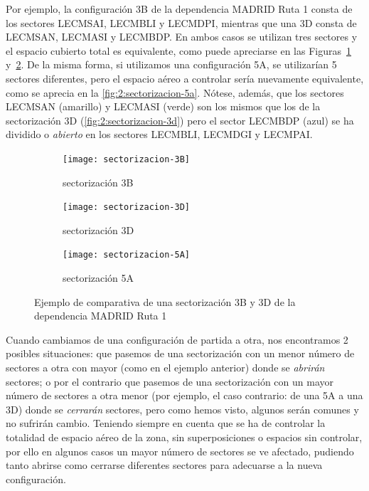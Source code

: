 Por ejemplo, la configuración 3B de la dependencia MADRID Ruta 1 consta de los sectores LECMSAI, LECMBLI y LECMDPI, mientras que una 3D consta de LECMSAN, LECMASI y LECMBDP. En ambos casos se utilizan tres sectores y el espacio cubierto total es equivalente, como puede apreciarse en las Figuras~\ref{fig:sectorizacion-3b} y~\ref{fig:2:sectorizacion-3d}.
De la misma forma, si utilizamos una configuración 5A, se utilizarían 5 sectores diferentes, pero el espacio aéreo a controlar sería nuevamente equivalente, como se aprecia en la \autoref{fig:2:sectorizacion-5a}.
Nótese, además, que los sectores LECMSAN (amarillo) y LECMASI (verde) son los mismos que los de la sectorización 3D (\autoref{fig:2:sectorizacion-3d}) pero el sector LECMBDP (azul) se ha dividido o \textit{abierto} en los sectores LECMBLI, LECMDGI y LECMPAI\@.

\begin{figure}[htbp]
    \centering
    \begin{subfigure}{\linewidth}
        \centering
        \texttt{[image: sectorizacion-3B]}
        \caption{sectorización 3B\linebreak}
        \label{fig:sectorizacion-3b}
    \end{subfigure}

    \begin{subfigure}{\linewidth}
        \centering
        \texttt{[image: sectorizacion-3D]}
        \caption{sectorización 3D\linebreak}
        \label{fig:2:sectorizacion-3d}
    \end{subfigure}

    \begin{subfigure}{\linewidth}
        \centering
        \texttt{[image: sectorizacion-5A]}
        \caption{sectorización 5A}
        \label{fig:2:sectorizacion-5a}
    \end{subfigure}

    \caption[Ejemplo de sectorización 3B y 3D de la dependencia MADRID Ruta 1]{Ejemplo de comparativa de una 
    sectorización 3B y 3D 
    de la dependencia MADRID Ruta 1}
    \label{fig:2:comparativa3B-3D}
\end{figure}


Cuando cambiamos de una configuración de partida a otra, nos encontramos 2 posibles situaciones: que pasemos de una sectorización con un menor número de sectores a otra con mayor (como en el ejemplo anterior) donde se \textit{abrirán} sectores; o por el contrario que pasemos de una sectorización con un mayor número de sectores a otra menor (por ejemplo, el caso contrario: de una 5A a una 3D) donde se \textit{cerrarán} sectores, pero como hemos visto, algunos serán comunes y no sufrirán cambio. 
Teniendo siempre en cuenta que se ha de controlar la totalidad de espacio aéreo de la zona, sin superposiciones o espacios sin controlar, por ello en algunos casos un mayor número de sectores se ve afectado, pudiendo tanto abrirse como cerrarse diferentes sectores para adecuarse a la nueva configuración.

